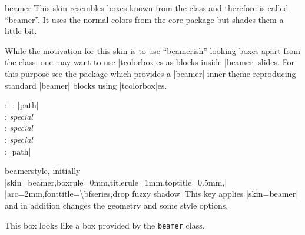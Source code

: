 \begin{docSkin}{beamer}
  This skin resembles boxes known from the  class and therefore is
  called \enquote{beamer}. It uses the normal colors from the core package but shades
  them a little bit.\par
  While the motivation for this skin is to use \enquote{beamerish} looking
  boxes apart from the  class, one may want to use |tcolorbox|es
  as blocks inside |beamer| slides. For this purpose see the package 
  which provides a |beamer| inner theme reproducing standard |beamer| blocks using |tcolorbox|es.
\begin{tcolorbox}[skintable=beamer]
  \begin{tabbing}
    : \=\kill
    :           \> |path|\\
    : \> \emph{special}\\ 
    :        \> \emph{special}\\
    :    \> \emph{special}\\
    :           \> |path|
  \end{tabbing}
\end{tcolorbox}
\end{docSkin}



\begin{docTcbKey}{beamer}{}{style, initially\\
  |skin=beamer,boxrule=0mm,titlerule=1mm,toptitle=0.5mm,|\\
  |arc=2mm,fonttitle=\textbackslash bfseries,drop fuzzy shadow|
}
  This key applies |skin=beamer| and in addition changes the geometry and some style options.
\end{docTcbKey}



\begin{dispExample}
\end{dispExample}



\begin{dispExample}
\begin{tcolorbox}[beamer,colback=Salmon!50!white,colframe=FireBrick!75!black,
  adjusted title=A colored box with the ``beamer'' skin]
This box looks like a box provided by the \texttt{beamer} class.
\end{tcolorbox}
\end{dispExample}


